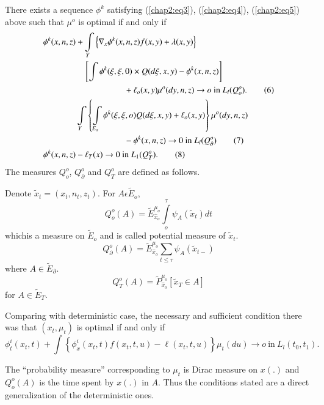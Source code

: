 \begin{thm}%
  There exists a sequence $\phi^k$ satisfying (\ref{chap2:eq3}),
  (\ref{chap2:eq4}), (\ref{chap2:eq5}) above such
  that $\mu^o$ is optimal if and only if 
  \begin{align*}
    \phi^k  (x, n, z) & + \int\limits_Y \left\{\nabla_x \phi^k (x, n,
    z) f(x, y) + \lambda (x, y)\right\}\\ 
    & \quad \left[ \int \phi^k (\xi, \xi,0)
      \vphantom{\int}\times Q (d \xi, x, y) - \phi^k (x, n,
      z)\right]\\ 
    & \hspace{2cm}+ \ell_o (x, y) \mu^o (dy, n, z) 
    \to o ~\text{in}~ L_l (Q^o_o). \tag{6}\label{chap2:eq6}\\
    & \int\limits_Y \left\{ \int\limits_{E_o} \phi^k (\xi, \xi, o) Q
    (d \xi, x, y) + \ell_o(x, y)\right\}\mu^o (dy,n, z)\\
    & \hspace{2cm}- \phi^k (x, n, z) \to 0 ~\text{in}~ L_l (Q^o_\partial)
    \tag{7}\label{chap2:eq7}\\
    \phi^k (x, n, z) &- \ell_T (x) \to 0 ~\text{in}~ L_1
    (Q^o_T).\tag{8}\label{chap2:eq8} 
  \end{align*}
The measures $Q^o_o$, $Q^o_\partial$ and $Q^o_T$ are defined as
follows. 

Denote $\tilde{x}_t= (x_t, n_t, z_t)$. For $A \epsilon
\tilde{E}_o$,
$$
Q^o_o (A)= \tilde{E}^{\mu_o}_{\hat{x}_o} \int\limits^\tau_o \psi_A
(\tilde{x}_t) dt
$$ 
which\pageoriginale is a measure on $\tilde{E}_o$ and is called
potential measure of $\tilde{x}_t$. 
$$
Q^o_\partial (A)= \tilde{E}^{\mu_o}_{\hat{x}_o} \sum\limits_{t \leq
  \tau} \psi_A (\tilde{x}_{t-})
$$
where $A \in  \tilde{E}_\partial$.
$$
Q^o_T (A)= \tilde{P}^{\mu_o}_{\hat{x}_o}  [\tilde{x}_T \in  A]
$$
for $A \in  \tilde{E}_T$.
\end{thm}

Comparing with deterministic case, the necessary and sufficient
condition there was that $(x_t, \mu_t)$ is optimal if and only if 
$$
\phi^i_t (x_t, t) + \int \left\{\phi^i_x (x_t, t) f(x_t, t, u)- \ell
(x_t, t, u)\right\}\mu_t (du) \to o ~\text{in}~ L_l (t_0, t_1).
$$

The ``probability measure'' corresponding to $\mu_t$ is Dirac measure
on $x(.)$ and $Q^o_o (A)$ is the time spent by $x(.)$ in $A$. Thus the
conditions stated are a direct generalization of the deterministic
ones. 

